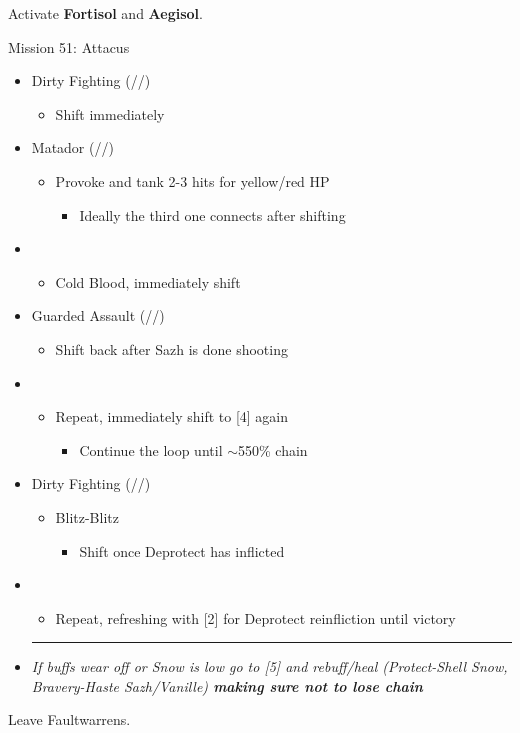 \renewcommand{\second}{[2] Dirty Fighting (\com/\sen/\sab)}
\renewcommand{\fourth}{[4] Guarded Assault (\sen/\sen/\com)}
\renewcommand{\fifth}{[5] Protection (\syn/\sen/\med)}
\renewcommand{\sixth}{[6] Matador (\sen/\rav/\sab)}

Activate \textbf{Fortisol} and \textbf{Aegisol}.
\vfill

\begin{battle}{Mission 51: Attacus}
	\begin{itemize}
		\item \second
			\begin{itemize}
				\item Shift immediately
			\end{itemize}
		\item \sixth
			\begin{itemize}
				\item Provoke and tank 2-3 hits for yellow/red HP
					\begin{itemize}
						\item Ideally the third one connects after shifting
					\end{itemize}
			\end{itemize}
		\item \third
			\begin{itemize}
				\item Cold Blood, immediately shift
			\end{itemize}
		\item \fourth
			\begin{itemize}
				\item Shift back after Sazh is done shooting
			\end{itemize}
		\item \third
			\begin{itemize}
				\item Repeat, immediately shift to [4] again
					\begin{itemize}
						\item Continue the loop until $\sim$550\% chain
					\end{itemize}
			\end{itemize}
		\item \second
			\begin{itemize}
				\item Blitz-Blitz
					\begin{itemize}
						\item Shift once Deprotect has inflicted
					\end{itemize}
			\end{itemize}
		\item \first
			\begin{itemize}
				\item Repeat, refreshing with [2] for Deprotect reinfliction until victory
			\end{itemize}
		\rule{.9\columnwidth}{1pt}
		\item \textit{ If buffs wear off or Snow is low go to [5] and rebuff/heal (Protect-Shell Snow, Bravery-Haste Sazh/Vanille) \textbf{making sure not to lose chain}}
	\end{itemize}
\end{battle}

Leave Faultwarrens.
\vfill
